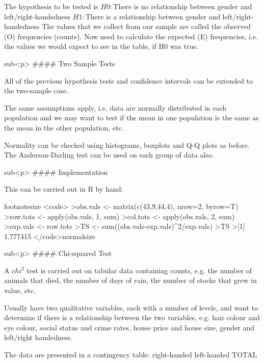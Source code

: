 The hypothesis to be tested is
$H0 :$There is no relationship between gender and left/right-handedness
$H1 :$There is a relationship between gender and left/right-handedness
The values that we collect from our sample are called the observed
(O) frequencies (counts). Now need to calculate the expected (E)
frequencies, i.e. the values we would expect to see in the table, if
H0 was true.






sub<p>
#### {Two Sample Tests}


All of the previous hypothesis tests and confidence intervals can be
extended to the two-sample case.

The same assumptions apply, i.e. data are normally distributed in
each population and we may want to test if the mean in one
population is the same as the mean in the other population, etc.

Normality can be checked using histograms, boxplots and Q-Q
plots as before. The Anderson-Darling test can be used on
each group of data also.


sub<p>
#### {Implementation}

This can be carried out in R by hand:

footnotesize <code>
>obs.vals <- matrix(c(43,9,44,4), nrow=2, byrow=T)
>row.tots <- apply(obs.vals, 1, sum)
>col.tots <- apply(obs.vals, 2, sum)
>exp.vals <- row.tots%
>TS <- sum((obs.vals-exp.vals)^2/exp.vals)
>TS
>[1] 1.777415
</code>normalsize




sub<p>
#### {Chi-squared Test}

A $chi^2$ test is carried out on tabular data containing counts, e.g. the
number of animals that died, the number of days of rain, the
number of stocks that grew in value, etc.

Usually have two qualitative variables, each with a number of
levels, and want to determine if there is a relationship between the
two variables, e.g. hair colour and eye colour, social status and
crime rates, house price and house size, gender and left/right
handedness.

The data are presented in a contingency table:
right-handed left-handed TOTAL

